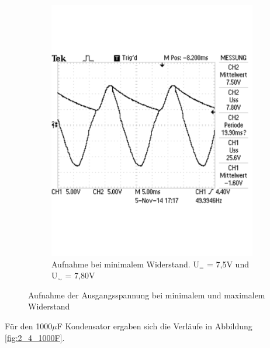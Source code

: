 \documentclass[12pt,a4paper]{article}
\begin{document}
\begin{figure}[H]
\begin{subfigure}[b]{0.48\textwidth}
                \includegraphics[width=\textwidth , scale = 0.4]{2_4_100F_2.pdf}
                \caption[Aufnahme bei minimalem Widerstand. U$_{=}$ = 7,5V und U$_\sim$ = 7,80V]{Aufnahme bei minimalem Widerstand. U$_{=}$ = 7,5V und U$_\sim$ = 7,80V}
  				\label{fig:2_4_100F_2}
        \end{subfigure}
        \caption{Aufnahme der Ausgangsspannung bei minimalem und maximalem Widerstand}
        \label{fig:2_4_100F}
\end{figure}

Für den 1000$\mu$F Kondensator ergaben sich die Verläufe in Abbildung \ref{fig:2_4_1000F}.
\end{document}
